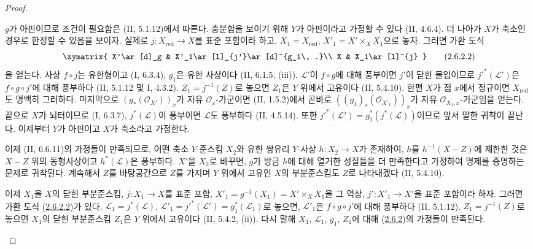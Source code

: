 \begin{proof}
\begin{env}[2.6.2.1]
\label{III.2.6.2.1-fr}
$g$가 아핀이므로 조건이 필요함은 (II, 5.1.12)에서 따른다. 충분함을
보이기 위해 $Y$가 아핀이라고 가정할 수 있다 (II, 4.6.4). 더 나아가
$X$가 축소인 경우로 한정할 수 있음을 보이자. 실제로
$j:X_{\mathrm{red}}\to X$를 표준 포함이라 하고,
$X_1=X_{\mathrm{red}}$, $X'_1=X'\times_X X_1$으로 놓자. 그러면 가환
도식
\[
\xymatrix{
X'\ar[d]_g & X'_1\ar[l]_{j'}\ar[d]^{g_1\, .}\\
X & X_1\ar[l]^{j}
}
\tag{2.6.2.2}\label{III.2.6.2.2-fr}
\]
을 얻는다. 사상 $f\circ j$는 유한형이고 (I, 6.3.4), $g_1$은 유한
사상이다 (II, 6.1.5, (iii)). $\mathcal L'$이 $f\circ g$에 대해
풍부이면 $j'$이 닫힌 몰입이므로
$j'^*(\mathcal L')$은 $f\circ g\circ j'$에 대해 풍부하다
(II, 5.1.12 및 I, 4.3.2). $Z_1=j^{-1}(Z)$로 놓으면 $Z_1$은 $Y$ 위에서
고유이다 (II, 5.4.10). 한편 $X$가 점 $x$에서 정규이면
$X_{\mathrm{red}}$도 명백히 그러하다. 마지막으로
$(g_*(\mathcal O_{X'}))_x$가 자유 $\mathcal O_x$-가군이면
(II, 1.5.2)에서 곧바로
$((g_1)_*(\mathcal O_{X'_1}))_x$가 자유 $\mathcal O_{X_1,x}$-가군임을
얻는다. 끝으로 $X$가 뇌터이므로 (I, 6.3.7), $j^*(\mathcal L)$이
풍부이면 $\mathcal L$도 풍부하다 (II, 4.5.14). 또한
$j'^*(\mathcal L')=g_1^*(j^*(\mathcal L))$이므로 앞서 말한 귀착이
끝난다. 이제부터 $Y$가 아핀이고 $X$가 축소라고 가정한다.
\end{env}

이제 (II, 6.6.11)의 가정들이 만족되므로, 어떤 축소 $Y$-준스킴
$X_2$와 유한 쌍유리 $Y$-사상 $h:X_2\to X$가 존재하여,
$h$를 $h^{-1}(X-Z)$에 제한한 것은 $X-Z$ 위의 동형사상이고
$h^*(\mathcal L)$은 풍부하다. $X'$을 $X_2$로 바꾸면, $g$가 방금
$h$에 대해 열거한 성질들을 더 만족한다고 가정하여 명제를 증명하는
문제로 귀착된다. 계속해서 $Z$를 바탕공간으로 $Z$를 가지며 $Y$ 위에서
고유인 $X$의 부분준스킴도 $Z$로 나타내겠다 (II, 5.4.10).

\begin{env}[2.6.2.3]
\label{III.2.6.2.3-fr}
이제 $X_1$을 $X$의 닫힌 부분준스킴, $j:X_1\to X$를 표준 포함,
$X'_1=g^{-1}(X_1)=X'\times_X X_1$을 그 역상,
$j':X'_1\to X'$을 표준 포함이라 하자. 그러면 가환 도식
(\hyperref[III.2.6.2.2-fr]{2.6.2.2})가 있다.
$\mathcal L_1=j^*(\mathcal L)$,
$\mathcal L'_1=j'^*(\mathcal L')=g_1^*(\mathcal L_1)$로 놓으면,
$\mathcal L'_1$은 $f\circ g\circ j'$에 대해 풍부하다
(II, 5.1.12). $Z_1=j^{-1}(Z)$로 놓으면 $X_1$의 닫힌 부분준스킴
$Z_1$은 $Y$ 위에서 고유이다 (II, 5.4.2, (ii)). 다시 말해 $X_1$,
$\mathcal L_1$, $g_1$, $Z_1$에 대해
(\hyperref[III.2.6.2-fr]{2.6.2})의 가정들이 만족된다.
\end{env}


\end{proof}
